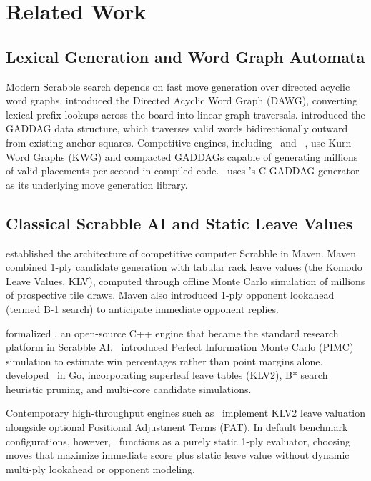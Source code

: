 \section{Related Work}
\label{sec:related_work}

\subsection{Lexical Generation and Word Graph Automata}

Modern Scrabble search depends on fast move generation over directed acyclic word graphs. \citet{appel1988world} introduced the Directed Acyclic Word Graph (DAWG), converting lexical prefix lookups across the board into linear graph traversals. \citet{gordon1994faster} introduced the GADDAG data structure, which traverses valid words bidirectionally outward from existing anchor squares. Competitive engines, including \magpie\ and \macondo\ \citep{del2022macondo}, use Kurn Word Graphs (KWG) and compacted GADDAGs capable of generating millions of valid placements per second in compiled code. \algo\ uses \magpie's C GADDAG generator as its underlying move generation library.

\subsection{Classical Scrabble AI and Static Leave Values}

\citet{sheppard2002world} established the architecture of competitive computer Scrabble in Maven. Maven combined 1-ply candidate generation with tabular rack leave values (the Komodo Leave Values, KLV), computed through offline Monte Carlo simulation of millions of prospective tile draws. Maven also introduced 1-ply opponent lookahead (termed B-1 search) to anticipate immediate opponent replies.

\citet{olaughlin2006quackle} formalized \quackle, an open-source C++ engine that became the standard research platform in Scrabble AI. \quackle\ introduced Perfect Information Monte Carlo (PIMC) simulation to estimate win percentages rather than point margins alone. \citet{del2022macondo} developed \macondo\ in Go, incorporating superleaf leave tables (KLV2), B* search heuristic pruning, and multi-core candidate simulations.

Contemporary high-throughput engines such as \magpie\ implement KLV2 leave valuation alongside optional Positional Adjustment Terms (PAT). In default benchmark configurations, however, \magpie\ functions as a purely static 1-ply evaluator, choosing moves that maximize immediate score plus static leave value without dynamic multi-ply lookahead or opponent modeling.


